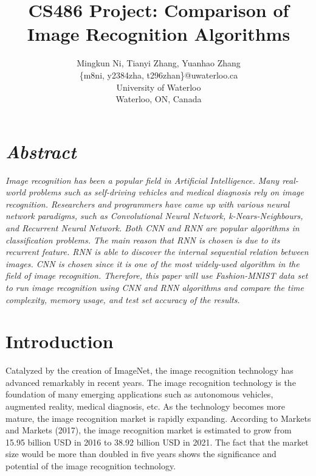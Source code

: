 \documentclass[letterpaper]{article} %
\begin{document}
%
\title{CS486 Project: Comparison of Image Recognition Algorithms}
\author{Mingkun Ni, Tianyi Zhang, Yuanhao Zhang\\
\{m8ni, y2384zha, t296zhan\}@uwaterloo.ca\\
University of Waterloo\\
Waterloo, ON, Canada\\
}
\maketitle


\section{\em{Abstract}}
\textit{Image recognition has been a popular field in Artificial Intelligence. Many real-world problems such as self-driving vehicles and medical diagnosis rely on image recognition. Researchers and programmers have came up with various neural network paradigms, such as Convolutional Neural Network, k-Nears-Neighbours, and Recurrent Neural Network. Both CNN and RNN are popular algorithms in classification problems. The main reason that RNN is chosen is due to its recurrent feature. RNN is able to discover the internal sequential relation between images. CNN is chosen since it is one of the most widely-used algorithm in the field of image recognition. Therefore, this paper will use Fashion-MNIST data set to run image recognition using CNN and RNN algorithms and compare the time complexity, memory usage, and test set accuracy of the results.}


\section{Introduction}

Catalyzed by the creation of ImageNet, the image recognition technology has advanced remarkably in recent years. The image recognition technology is the foundation of many emerging applications such as autonomous vehicles, augmented reality, medical diagnosis, etc. As the technology becomes more mature, the image recognition market is rapidly expanding. According to Markets and Markets (2017), the image recognition market is estimated to grow from 15.95 billion USD in 2016 to 38.92 billion USD in 2021. The fact that the market size would be more than doubled in five years shows the significance and potential of the image recognition technology. 
\end{document}
